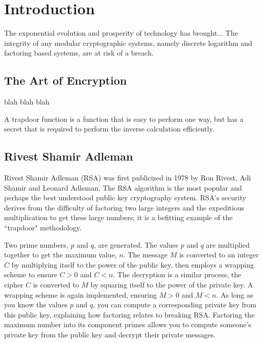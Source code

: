\section{Introduction}
The exponential evolution and prosperity of technology has brought...
The integrity of any modular cryptographic systems, namely discrete logarithm and factoring based systems, are at risk of a breach. 

\subsection{The Art of Encryption}
blah blah blah

A trapdoor function is a function that is easy to perform one way, but has a secret that is required to perform the inverse calculation efficiently. 

\subsection{Rivest Shamir Adleman}
 Rivest Shamir Adleman (RSA) was first publicized in 1978 by Ron Rivest, Adi Shamir and Leonard Adleman. The RSA algorithm is the most popular and  perhaps the best understood public key cryptography system. RSA's security derives from the difficulty of factoring two large integers and the expeditious multiplication to get these large numbers; it is a befitting example of the ``trapdoor" methodology. 
 
 Two prime numbers, \(p\) and \(q\), are generated. The values \(p\) and \(q\) are multiplied together to get the maximum value, \(n\). The message \(M\) is converted to an integer \(C\) by multiplying itself to the power of the public key, then employs a wrapping scheme to ensure \(C > 0\) and \(C < n\). The decryption is a similar process, the cipher \(C\) is converted to \(M\) by squaring itself to the power of the private key. A wrapping scheme is again implemented, ensuring \(M > 0\) and \(M < n\). As long as you know the values \(p\) and \(q\), you can compute a corresponding private key from this public key, explaining how factoring relates to breaking RSA. Factoring the maximum number into its component primes allows you to compute someone's private key from the public key and decrypt their private messages.



